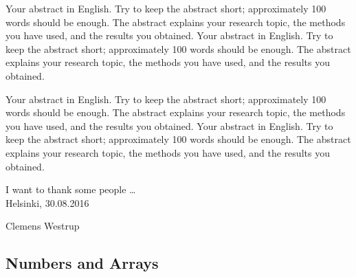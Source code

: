 \begin{abstractpage}[english]
  Your abstract in English. Try to keep the abstract short; approximately
  100 words should be enough. The abstract explains your research topic,
  the methods you have used, and the results you obtained.
  Your abstract in English. Try to keep the abstract short; approximately
  100 words should be enough. The abstract explains your research topic,
  the methods you have used, and the results you obtained.

  Your abstract in English. Try to keep the abstract short; approximately
  100 words should be enough. The abstract explains your research topic,
  the methods you have used, and the results you obtained.
  Your abstract in English. Try to keep the abstract short; approximately
  100 words should be enough. The abstract explains your research topic,
  the methods you have used, and the results you obtained.
\end{abstractpage}

\newpage


I want to thank some people \ldots
\\

\vspace{5cm}
Helsinki, 30.08.2016

\vspace{5mm}
{\hfill Clemens Westrup \hspace{1cm}}

\newpage

\thesistableofcontents
\clearpage


\subsection*{Numbers and Arrays}


